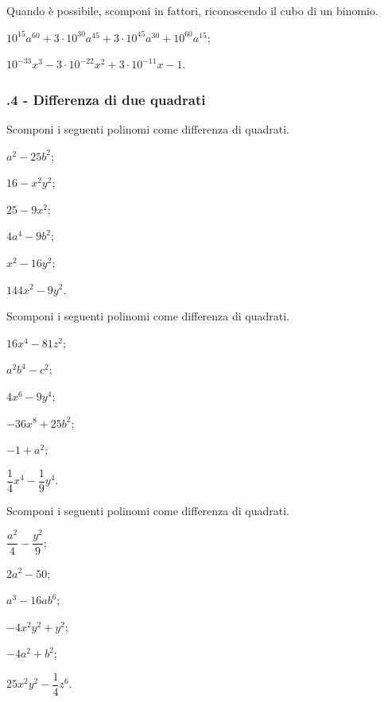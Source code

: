 \begin{esercizio}
\label{ese:16.28}
Quando è possibile, scomponi in fattori, riconoscendo il cubo di un binomio.
\begin{enumeratea}
 \item $10^{15}a^{60}+3\cdot 10^{30}a^{45}+3\cdot 10^{45}a^{30}+10^{60}a^{15}$;
 \item $10^{-33}x^{3}-3\cdot 10^{-22}x^{2}+3\cdot 10^{-11}x-1$.
\end{enumeratea}
\end{esercizio}

\subsubsection*{\thechapter.4 - Differenza di due quadrati}
\begin{multicols}{2}
\begin{esercizio}
\label{ese:16.29}
Scomponi i seguenti polinomi come differenza di quadrati.
\begin{enumeratea}
 \item $a^{2}-25b^{2}$;
 \item $16-x^{2}y^{2}$;
 \item $25-9x^{2}$;
 \item $4a^{4}-9b^{2}$;
 \item $x^{2}-16y^{2}$;
 \item $144x^{2}-9y^{2}$.
\end{enumeratea}
\end{esercizio}

\begin{esercizio}
\label{ese:16.30}
Scomponi i seguenti polinomi come differenza di quadrati.
\begin{enumeratea}
 \item $16x^{4}-81z^{2}$;
 \item $a^{2}b^{4}-c^{2}$;
 \item $4x^{6}-9y^{4}$;
 \item $-36x^{8}+25b^{2}$;
 \item $-1+a^{2}$;
 \item $\dfrac{1}{4}x^{4}-\dfrac{1}{9}y^{4}$.
\end{enumeratea}
\end{esercizio}

\begin{esercizio}
\label{ese:16.31}
Scomponi i seguenti polinomi come differenza di quadrati.
\begin{enumeratea}
 \item $\dfrac{a^{2}}{4}-\dfrac{y^{2}}{9}$;
 \item $2a^{2}-50$;
 \item $a^{3}-16{ab}^{6}$;
 \item $-4x^{2}y^{2}+y^{2}$;
 \item $-4a^{2}+b^{2}$;
 \item $25x^{2}y^{2}-\dfrac{1}{4}z^{6}$.
\end{enumeratea}
\end{esercizio}


\end{multicols}
